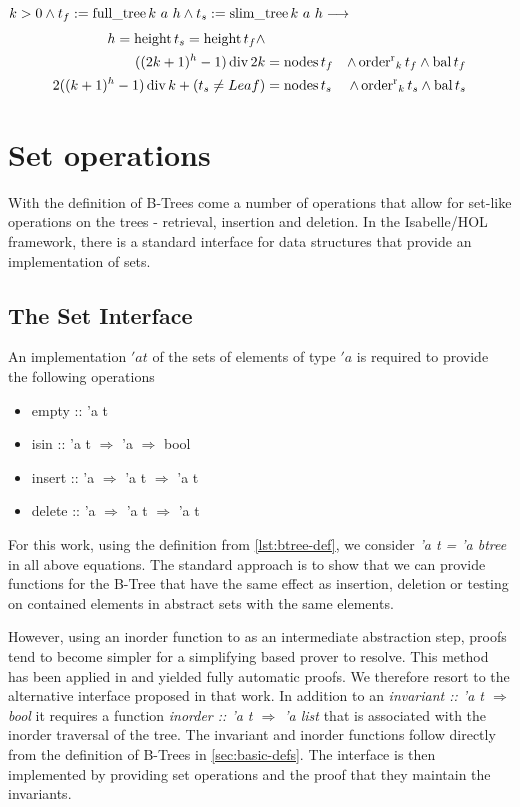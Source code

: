 \begin{theorem}
    $k > 0 \wedge t_f := \operatorname{full\_tree} k\ a\ h \wedge t_s := \operatorname{slim\_tree} k\ a\ h \longrightarrow$
    \begin{align}
    h = \operatorname{height} t_s = \operatorname{height} t_f \wedge \\
        ((2k+1)^h - 1) \operatorname{div} 2k &= \operatorname{nodes} t_f &\wedge \operatorname{order^r}_k t_f \wedge \operatorname{bal} t_f \\ 
        2((k+1)^h - 1) \operatorname{div} k + (t_s \neq Leaf) &= \operatorname{nodes} t_s &\wedge \operatorname{order^r}_k t_s \wedge \operatorname{bal} t_s
    \end{align}
\end{theorem}


\section{Set operations}

With the definition of B-Trees come a number of operations that allow for set-like operations
on the trees - retrieval, insertion and deletion.
In the Isabelle/HOL framework, there is a standard interface
for data structures that provide an implementation of sets.

\subsection{The Set Interface}

An implementation $'a t$ of the sets of elements of type $'a$ is required to provide the following
operations

\begin{itemize}
    \itshape
    \item empty :: 'a t
    \item isin :: 'a t $\Rightarrow$ 'a $\Rightarrow$ bool
    \item insert :: 'a $\Rightarrow$ 'a t $\Rightarrow$ 'a t
    \item delete :: 'a $\Rightarrow$ 'a t $\Rightarrow$ 'a t
\end{itemize}

For this work, using the definition from \autoref{lst:btree-def},
we consider \textit{'a t = 'a btree} in all above equations.
The standard approach is to show that we can provide functions for the B-Tree
that have the same effect as insertion, deletion or testing on contained elements
in abstract sets with the same elements.

However, using an inorder function to
as an intermediate abstraction step, proofs tend to become simpler for a simplifying
based prover to resolve. 
This method has been applied in \parencite{DBLP:conf/itp/Nipkow16} and yielded
fully automatic proofs.
We therefore resort to the alternative interface proposed in that work.
In addition to an \textit{invariant :: 'a t $\Rightarrow$ bool}
it requires a function \textit{inorder :: 'a t $\Rightarrow$ 'a list}
that is associated with the inorder traversal of the tree.
The invariant and inorder functions follow directly from the
definition of B-Trees in \autoref{sec:basic-defs}.
The interface is then implemented by providing set operations
and the proof that they maintain the invariants.

